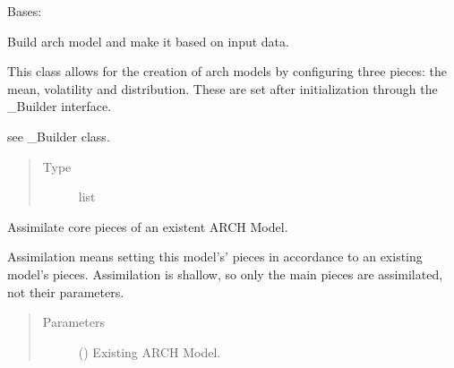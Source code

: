 \documentclass[letterpaper,10pt,english]{sphinxmanual}
\begin{document}
\begin{fulllineitems}
\label{\detokenize{dalio.pipe:dalio.pipe.MakeARCH}}
Bases: {\hyperref[\detokenize{dalio.pipe:dalio.pipe.pipe.PipeBuilder}]{}}

Build arch model and make it based on input data.

This class allows for the creation of arch models by configuring three
pieces: the mean, volatility and distribution. These are set after
initialization through the \_Builder interface.

\begin{fulllineitems}
\label{\detokenize{dalio.pipe:dalio.pipe.MakeARCH._piece}}
see \_Builder class.
\begin{quote}\begin{description}
\item[{Type}] \leavevmode
list

\end{description}\end{quote}

\end{fulllineitems}


\begin{fulllineitems}
\label{\detokenize{dalio.pipe:dalio.pipe.MakeARCH.assimilate}}
Assimilate core pieces of an existent ARCH Model.

Assimilation means setting this model’s’ pieces in accordance to an
existing model’s pieces. Assimilation is shallow, so only the main
pieces are assimilated, not their parameters.
\begin{quote}\begin{description}
\item[{Parameters}] \leavevmode
{} () \textendash{} Existing ARCH Model.

\end{description}\end{quote}


\end{fulllineitems}
\end{fulllineitems}
\end{document}
